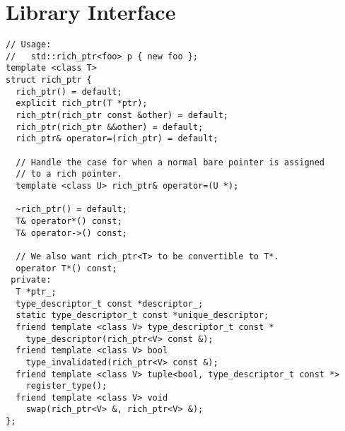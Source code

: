 \section{Library Interface}
\label{appendix:rich_ptr-interface}

\begin{verbatim}
// Usage:
//   std::rich_ptr<foo> p { new foo };
template <class T>
struct rich_ptr {
  rich_ptr() = default;
  explicit rich_ptr(T *ptr);
  rich_ptr(rich_ptr const &other) = default;
  rich_ptr(rich_ptr &&other) = default;
  rich_ptr& operator=(rich_ptr) = default;

  // Handle the case for when a normal bare pointer is assigned
  // to a rich pointer.
  template <class U> rich_ptr& operator=(U *);

  ~rich_ptr() = default;
  T& operator*() const;
  T& operator->() const;

  // We also want rich_ptr<T> to be convertible to T*.
  operator T*() const;
 private:
  T *ptr_;
  type_descriptor_t const *descriptor_;
  static type_descriptor_t const *unique_descriptor;
  friend template <class V> type_descriptor_t const *
    type_descriptor(rich_ptr<V> const &);
  friend template <class V> bool
    type_invalidated(rich_ptr<V> const &);
  friend template <class V> tuple<bool, type_descriptor_t const *>
    register_type();
  friend template <class V> void
    swap(rich_ptr<V> &, rich_ptr<V> &);
};
\end{verbatim}